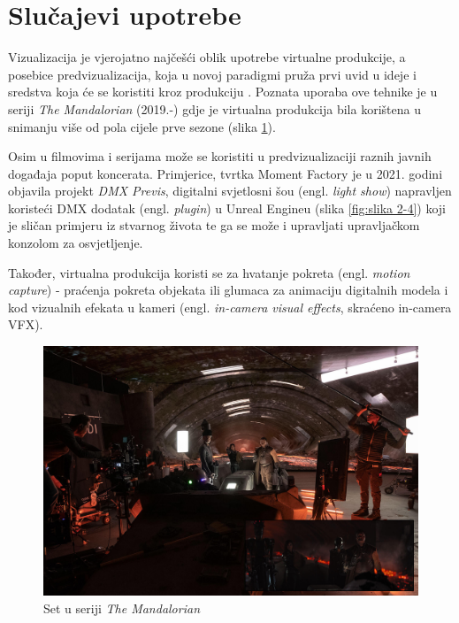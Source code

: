 \documentclass[times, utf8, zavrsni, numeric]{fer}
\begin{document}
\section{Slučajevi upotrebe}
Vizualizacija je vjerojatno najčešći oblik upotrebe virtualne produkcije, a posebice predvizualizacija, koja u novoj paradigmi pruža prvi uvid u ideje i sredstva koja će se koristiti kroz produkciju \cite{vpguide2}. Poznata uporaba ove tehnike je u seriji \emph{The Mandalorian} (2019.-) gdje je virtualna produkcija bila korištena u snimanju više od pola cijele prve sezone (slika \ref{fig:slika 2-3}). \newline

Osim u filmovima i serijama može se koristiti u predvizualizaciji raznih javnih događaja poput koncerata. Primjerice, tvrtka Moment Factory je u 2021. godini objavila projekt \emph{DMX Previs}, digitalni svjetlosni šou (engl. \emph{light show}) napravljen koristeći DMX dodatak (engl. \emph{plugin}) u Unreal Engineu (slika \ref{fig:slika 2-4}) koji je sličan primjeru iz stvarnog života te ga se može i upravljati upravljačkom konzolom za osvjetljenje. \newline

Također, virtualna produkcija koristi se za hvatanje pokreta (engl. \emph{motion capture}) - praćenja pokreta objekata ili glumaca za animaciju digitalnih modela i kod vizualnih efekata u kameri (engl. \emph{in-camera visual effects}, skraćeno in-camera VFX).

\begin{figure}[htp]
	\centering
	\includegraphics[width=\linewidth]{slika 2-3.png}
	\caption{Set u seriji \emph{The Mandalorian} \cite{mandalorian}}
	\label{fig:slika 2-3}
\end{figure}
\end{document}
